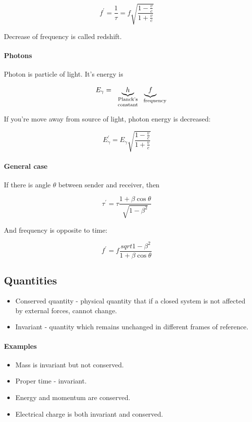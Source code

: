 $$f^\prime = \frac{1}{\tau} = f \sqrt{\frac{1-\frac{v}{c}}{1+\frac{v}{c}}}$$
  
  Decrease of frequency is called redshift.
  
  \paragraph{Photons}
  
  Photon is particle of light. It's energy is
  
  $$E_\gamma =\underbrace{h}_{\parbox{1.5cm}{\centering \scriptsize Planck's constant}}\underbrace{f}_{\parbox{0.7cm}{\centering \scriptsize frequency}}$$
  
  If you're move away from source of light, photon energy is decreased:
  
  $$E_\gamma^\prime = E_\gamma \sqrt{\frac{1-\frac{v}{c}}{1+\frac{v}{c}}}$$ 
  
  \paragraph{General case}
  
  If there is angle $\theta$ between sender and receiver, then 
  
  $$\tau^\prime = \tau \frac{1+\beta \cos \theta}{\sqrt{1-\beta^2}}$$
  
  And frequency is opposite to time:
  
  $$f^\prime = f \frac{sqrt{1-\beta^2}}{1+\beta \cos \theta}$$
  
  \subsection{Quantities}
  \begin{itemize}
  	\item Conserved quantity - physical quantity that if a closed system is not affected by external forces, cannot change.
  	\item Invariant - quantity which remains unchanged in different frames of reference.
  \end{itemize}
  
  \paragraph{Examples}
  
  \begin{itemize}
  	\item Mass is invariant but not conserved.
  	\item Proper time - invariant.
  	\item Energy and momentum are conserved.
  	\item Electrical charge is both invariant and conserved.
  \end{itemize}
  
